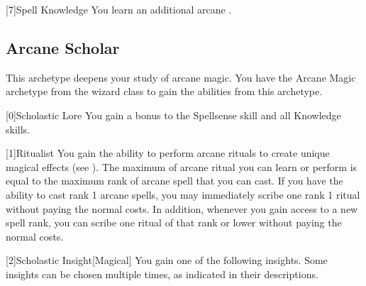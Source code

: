         [7]{Spell Knowledge} You learn an additional arcane .

    \newpage
    \subsection{Arcane Scholar}
        This archetype deepens your study of arcane magic.
        You have the Arcane Magic archetype from the wizard class to gain the abilities from this archetype.

        [0]{Scholastic Lore} You gain a  bonus to the Spellsense skill and all Knowledge skills.

        [1]{Ritualist} You gain the ability to perform arcane rituals to create unique magical effects (see ).
        The maximum  of arcane ritual you can learn or perform is equal to the maximum rank of arcane spell that you can cast.
        If you have the ability to cast rank 1 arcane spells, you may immediately scribe one rank 1 ritual without paying the normal costs.
        In addition, whenever you gain access to a new spell rank, you can scribe one ritual of that rank or lower without paying the normal costs.

        [2]{Scholastic Insight}[Magical]
        You gain one of the following insights.
        Some insights can be chosen multiple times, as indicated in their descriptions.

